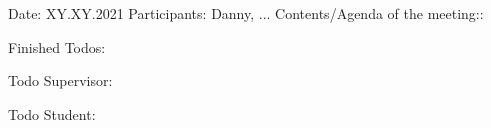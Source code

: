 Date: XY.XY.2021
Participants: Danny, ...
Contents/Agenda of the meeting::

Finished Todos:

Todo Supervisor:

Todo Student: